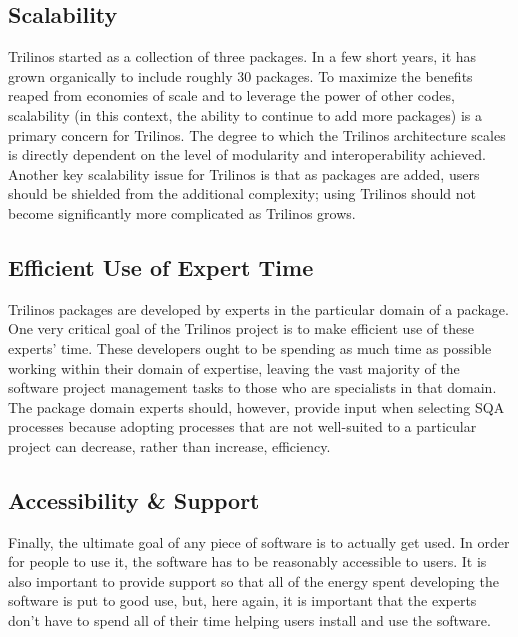 \documentclass[12pt,relax]{article}
\begin{document}
\subsection{Scalability}
Trilinos started as a collection of three packages.  In a few short years, it
has grown organically to include roughly 30 packages.  To maximize the
benefits reaped from economies of scale and to leverage the power of other
codes, scalability (in this context, the ability to continue to add more
packages) is a primary concern for Trilinos.  The degree to which the Trilinos
architecture scales is directly dependent on the level of modularity and
interoperability achieved.  Another key scalability issue for Trilinos is that
as packages are added, users should be shielded from the additional complexity;
using Trilinos should not become significantly more complicated as Trilinos
grows.

\subsection{Efficient Use of Expert Time}
Trilinos packages are developed by experts in the particular domain of a
package.  One very critical goal of the Trilinos project is to make efficient
use of these experts' time.  These developers ought to be spending as much 
time as possible working within their domain of expertise, leaving 
the vast majority of the software project 
management tasks to those who are specialists in that domain. 
The package domain experts should, however, provide input when selecting 
SQA processes because adopting processes that are not well-suited to a
particular project can decrease, rather than increase, efficiency.

\subsection{Accessibility \& Support}
Finally, the ultimate goal of any piece of software is to actually get used.  
In order for people to use it, the software has to be reasonably accessible to
users.  It is also important to provide support so that all of the energy spent
developing the software is put to good use, but, here again, it is important
that the experts don't have to spend all of their time helping users install
and use the software.

\clearpage

\end{document}
